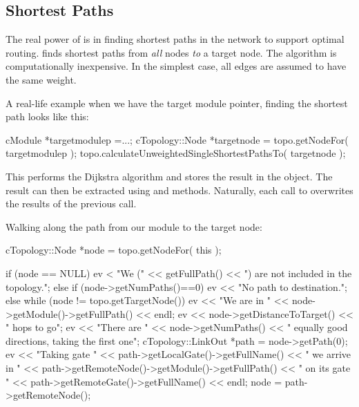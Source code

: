 \subsection{Shortest Paths}

The real power of  is in finding shortest
paths in the network to support optimal
routing.  finds shortest paths
from \textit{all} nodes \textit{to} a target node. The algorithm is
computationally inexpensive. In the simplest case, all edges are
assumed to have the same weight.

A real-life example when we have the target module pointer, finding
the shortest path looks like this:

\begin{cpp}
cModule *targetmodulep =...;
cTopology::Node *targetnode = topo.getNodeFor( targetmodulep );
topo.calculateUnweightedSingleShortestPathsTo( targetnode );
\end{cpp}


This performs the Dijkstra algorithm and
stores the result in the  object. The result can
then be extracted using  and
 methods.  Naturally, each call to
 overwrites the results of
the previous call.

Walking along the path from our module to the target node:

\begin{cpp}
cTopology::Node *node = topo.getNodeFor( this );

if (node == NULL)
{
  ev < "We (" << getFullPath() << ") are not included in the topology.\n";
}
else if (node->getNumPaths()==0)
{
  ev << "No path to destination.\n";
}
else
{
  while (node != topo.getTargetNode())
  {
    ev << "We are in " << node->getModule()->getFullPath() << endl;
    ev << node->getDistanceToTarget() << " hops to go\n";
    ev << "There are " << node->getNumPaths()
       << " equally good directions, taking the first one\n";
    cTopology::LinkOut *path = node->getPath(0);
    ev << "Taking gate " << path->getLocalGate()->getFullName()
       << " we arrive in " << path->getRemoteNode()->getModule()->getFullPath()
       << " on its gate " << path->getRemoteGate()->getFullName() << endl;
    node = path->getRemoteNode();
  }
}
\end{cpp}



